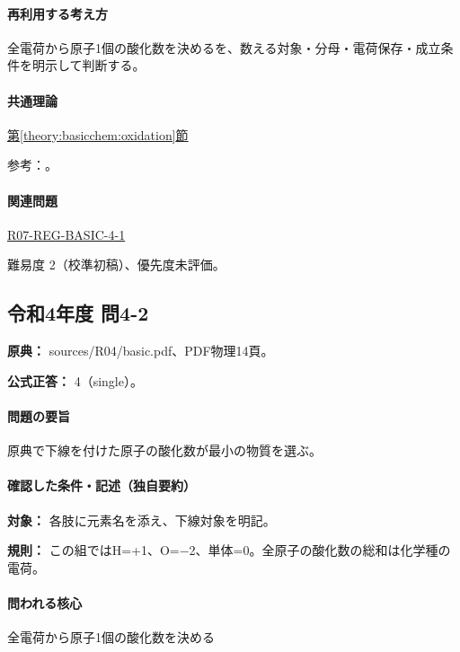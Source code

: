 \paragraph{再利用する考え方} 全電荷から原子1個の酸化数を決めるを、数える対象・分母・電荷保存・成立条件を明示して判断する。

\paragraph{共通理論} \hyperref[theory:basicchem:oxidation]{第\ref*{theory:basicchem:oxidation}節}

\par 参考：\cite{iupac_oxidation_state}。

\paragraph{関連問題} \hyperref[q:r07-reg-basic-4-1]{R07-REG-BASIC-4-1}

\par 難易度 2（校準初稿）、優先度未評価。

\subsection{令和4年度 問4-2}
\label{q:r04-reg-basic-4-2}

\noindent\textbf{原典：} sources/R04/basic.pdf、PDF物理14頁。

\textbf{公式正答：} 4（single）。

\paragraph{問題の要旨} 原典で下線を付けた原子の酸化数が最小の物質を選ぶ。

\paragraph{確認した条件・記述（独自要約）}\mbox{}\par

\noindent\textbf{対象：} 各肢に元素名を添え、下線対象を明記。\par

\noindent\textbf{規則：} この組ではH=+1、O=−2、単体=0。全原子の酸化数の総和は化学種の電荷。\par

\paragraph{問われる核心} 全電荷から原子1個の酸化数を決める

